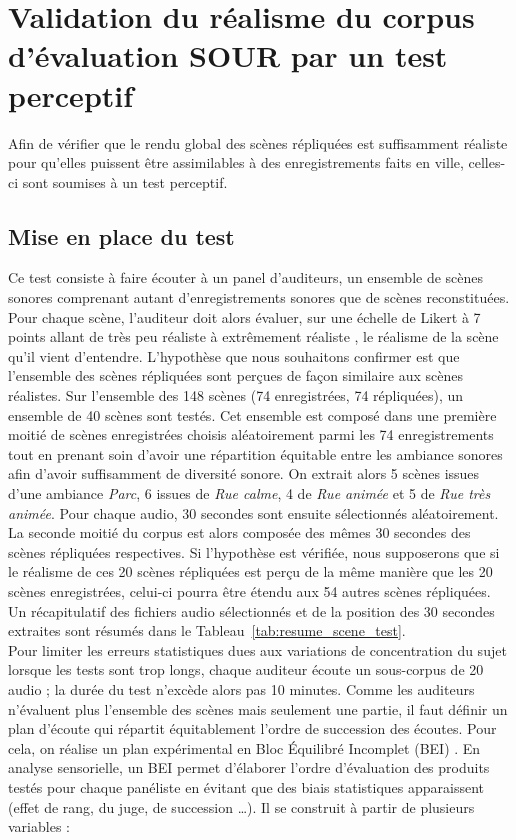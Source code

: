 \section{Validation du réalisme du corpus d'évaluation SOUR par un test perceptif}\label{sec:test}

Afin de vérifier que le rendu global des scènes répliquées est suffisamment réaliste pour qu'elles puissent être assimilables à des enregistrements faits en ville, celles-ci sont soumises à un test perceptif.

\subsection{Mise en place du test}

Ce test consiste à faire écouter à un panel d'auditeurs, un ensemble de scènes sonores comprenant autant d'enregistrements sonores que de scènes reconstituées. Pour chaque scène, l'auditeur doit alors évaluer, sur une échelle de Likert à 7 points allant de \og très peu réaliste \fg{} à \og extrêmement réaliste \fg{}, le réalisme de la scène qu'il vient d'entendre. L'hypothèse que nous souhaitons confirmer est que l'ensemble des scènes répliquées sont perçues de façon similaire aux scènes réalistes.
Sur l'ensemble des 148 scènes (74 enregistrées, 74 répliquées), un ensemble de 40 scènes sont testés.
Cet ensemble est composé dans une première moitié de scènes enregistrées choisis aléatoirement parmi les 74 enregistrements tout en prenant soin d'avoir une répartition équitable entre les ambiance sonores afin d'avoir suffisamment de diversité sonore. On extrait alors 5 scènes issues d'une ambiance \textit{Parc}, 6 issues de \textit{Rue calme}, 4 de \textit{Rue animée} et 5 de \textit{Rue très animée}. Pour chaque audio, 30 secondes sont ensuite sélectionnés aléatoirement.
La seconde moitié du corpus est alors composée des mêmes 30 secondes des scènes répliquées respectives. Si l'hypothèse est vérifiée, nous supposerons que si le réalisme de ces 20 scènes répliquées est perçu de la même manière que les 20 scènes enregistrées, celui-ci pourra être étendu aux 54 autres scènes répliquées. Un récapitulatif des fichiers audio sélectionnés et de la position des 30 secondes extraites sont résumés dans le Tableau~\ref{tab:resume_scene_test}.\\



Pour limiter les erreurs statistiques dues aux variations de concentration du sujet lorsque les tests sont trop longs, chaque auditeur écoute un sous-corpus de 20 audio ; la durée du test n'excède alors pas 10 minutes. Comme les auditeurs n'évaluent plus l'ensemble des scènes mais seulement une partie, il faut définir un plan d'écoute qui répartit équitablement l'ordre de succession des écoutes. Pour cela, on réalise un plan expérimental en \og Bloc Équilibré Incomplet \fg{} (BEI) \cite{pages_blocs_2007}.
En analyse sensorielle, un BEI permet d'élaborer l'ordre d'évaluation des produits testés pour chaque panéliste en évitant que des biais statistiques apparaissent (effet de rang, du juge, de succession \dots). Il se construit à partir de plusieurs variables :

